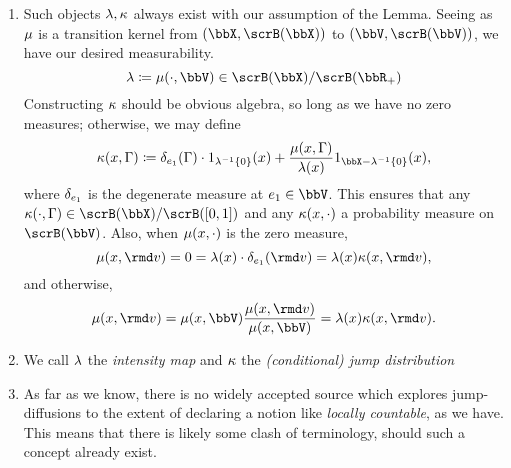 \begin{remark}
  \label{remark:countable}
  \begin{enumerate}[label=(\alph*)]
    \item
      Such objects $\lambda, \kappa$ always exist with our assumption of the Lemma.
      Seeing as $\mu$ is a transition kernel from $(\stateSpace, \scrB(\stateSpace))$ to $(\vecSpace, \scrB(\vecSpace))$, we have our desired measurability.
      \[
        \affInt \defeq \affJump(\cdot, \vecSpace) \in \scrB(\stateSpace)/\scrB(\bbR_+)
      \]
      Constructing $\kappa$ should be obvious algebra, so long as we have no zero measures; otherwise, we may define
      \[
        \affDist(\stateVar, \Gamma) \defeq \delta_{\basisVec_1}(\Gamma) \cdot 1_{\affInt^{-1}\{0\}}(\stateVar) + \frac{\affJump(\stateVar, \Gamma)}{\affInt(\stateVar)} 1_{\stateSpace - \affInt^{-1}\{0\}}(\stateVar),
      \]
      where $\delta_{e_1}$ is the degenerate measure at $\basisVec_1 \in \vecSpace$. 
      This ensures that any $\affDist(\cdot, \Gamma) \in \scrB(\stateSpace)/\scrB([0,1])$ and any $\kappa(x, \cdot)$ a probability measure on $\scrB(\vecSpace)$.
      Also, when $\mu(x, \cdot)$ is the zero measure,
      \[
        \affJump(\stateVar, \rmd\markVar) = 0 = \affInt(\stateVar) \cdot \delta_{\basisVec_1}(\rmd\markVar) = \affInt(\stateVar) \affDist(\stateVar, \rmd\markVar),
      \]
      and otherwise,
      \[
        \affJump(\stateVar, \rmd\markVar) = \affJump(\stateVar,\vecSpace) \frac{\affJump(\stateVar, \rmd\markVar)}{\affJump(\stateVar, \vecSpace)} = \affInt(\stateVar) \affDist(\stateVar, \rmd\markVar).
      \]
    \item
      We call $\lambda$ the \emph{intensity map} and $\kappa$ the \emph{(conditional) jump distribution}
    \item
      As far as we know, there is no widely accepted source which explores jump-diffusions to the extent of declaring a notion like \emph{locally countable}, as we have.
      This means that there is likely some clash of terminology, should such a concept already exist.
  \end{enumerate}
\end{remark}
